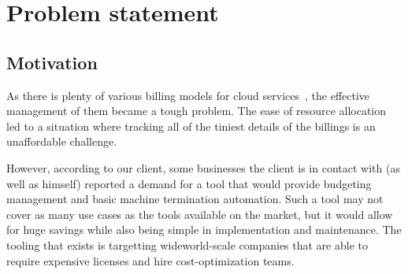 \documentclass[licencjacka,en]{thesisclass}
\begin{document}

    \chapter{Problem statement}

    \section{Motivation}

    As there is plenty of various billing models for cloud services~\cite{Laatikainen},
    the effective management of them became a tough problem.
    The ease of resource allocation led to a situation where tracking all of
    the tiniest details of the billings is an unaffordable challenge.

    However, according to our client, some businesses the client is in contact with
    (as well as himself) reported a demand for a tool that would provide budgeting management
    and basic machine termination automation.
    Such a tool may not cover as many use cases as the tools
    available on the market, but it would allow for huge savings while
    also being simple in implementation and maintenance.
    The tooling that exists is targetting wideworld-scale companies
    that are able to require expensive licenses and hire cost-optimization teams.
\end{document}
